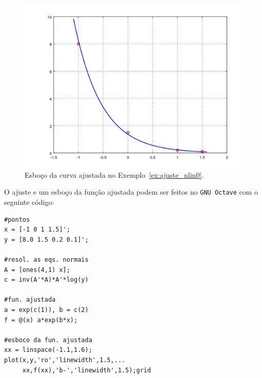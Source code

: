 \begin{ex}
\begin{figure}[h]
  \centering
  \includegraphics[width=\textwidth]{cap_ajuste/figs/ex_mq_nlin0/ex_mq_nlin0}
  \caption{Esboço da curva ajustada no Exemplo~\ref{ex:ajuste_nlin0}.}
  \label{fig:ex_mq_nlin0}
\end{figure}

\ifisoctave
O ajuste e um esboço da função ajustada podem ser feitos no \verb+GNU Octave+ com o seguinte código:
\begin{verbatim}
#pontos
x = [-1 0 1 1.5]';
y = [8.0 1.5 0.2 0.1]';

#resol. as eqs. normais
A = [ones(4,1) x];
c = inv(A'*A)*A'*log(y)

#fun. ajustada
a = exp(c(1)), b = c(2)
f = @(x) a*exp(b*x);

#esboco da fun. ajustada
xx = linspace(-1.1,1.6);
plot(x,y,'ro','linewidth',1.5,...
     xx,f(xx),'b-','linewidth',1.5);grid
\end{verbatim}
\fi

\end{ex}


